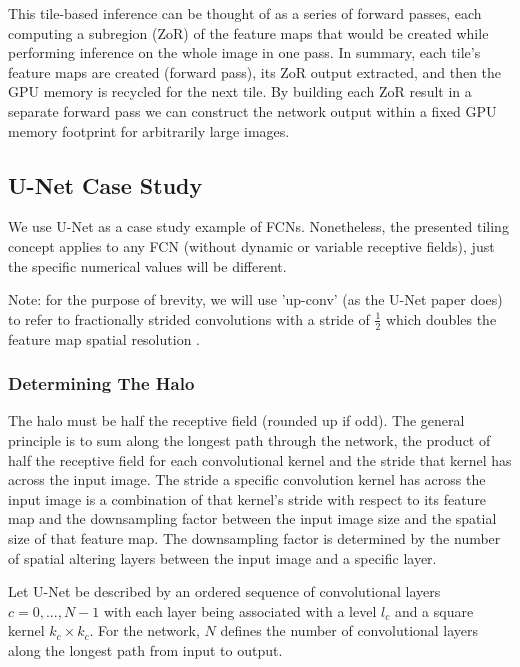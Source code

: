 \documentclass[10pt, indentfirst]{article}
\begin{document}
This tile-based inference can be thought of as a series of forward passes, each computing a subregion (ZoR) of the feature maps that would be created while performing inference on the whole image in one pass. 
In summary, each tile's feature maps are created (forward pass), its ZoR output extracted, and then the GPU memory is recycled for the next tile. By building each ZoR result in a separate forward pass we can construct the network output within a fixed GPU memory footprint for arbitrarily large images. 

\subsection{U-Net Case Study}

We use U-Net \citep{Ronneberger2015a} as a case study example of FCNs. Nonetheless, the presented tiling concept applies to any FCN (without dynamic or variable receptive fields), just the specific numerical values will be different. 

Note: for the purpose of brevity, we will use 'up-conv' (as the U-Net paper does) to refer to fractionally strided convolutions with a stride of $\frac{1}{2}$ which doubles the feature map spatial resolution \citep{Dumoulin2018}.

\subsubsection{Determining The Halo}

The halo must be half the receptive field (rounded up if odd). 
The general principle is to sum along the longest path through the network, the product of half the receptive field for each convolutional kernel and the stride that kernel has across the input image. The stride a specific convolution kernel has across the input image is a combination of that kernel's stride with respect to its feature map and the downsampling factor between the input image size and the spatial size of that feature map. The downsampling factor is determined by the number of spatial altering layers between the input image and a specific layer. 

Let U-Net be described by an ordered sequence of convolutional layers $c={0, ..., N-1}$ with each layer being associated with a level $l_{c}$ and a square kernel $k_{c} \times k_{c}$. 
For the network, $N$ defines the number of convolutional layers along the longest path from input to output. 
\end{document}
